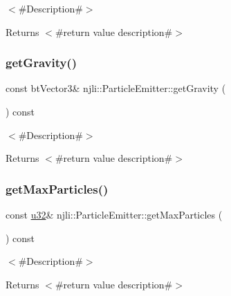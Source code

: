 $<$\#\+Description\#$>$

\begin{DoxyReturn}{Returns}
$<$\#return value description\#$>$ 
\end{DoxyReturn}
\mbox{\label{classnjli_1_1_particle_emitter_a35f6b8d1fd24e55ad727a647a711b6d4}} 
\subsubsection{\texorpdfstring{get\+Gravity()}{getGravity()}}
{\footnotesize\ttfamily const bt\+Vector3\& njli\+::\+Particle\+Emitter\+::get\+Gravity (\begin{DoxyParamCaption}{ }\end{DoxyParamCaption}) const}

$<$\#\+Description\#$>$

\begin{DoxyReturn}{Returns}
$<$\#return value description\#$>$ 
\end{DoxyReturn}
\mbox{\label{classnjli_1_1_particle_emitter_a655c16bec98188b693b70390ed62fc07}} 
\subsubsection{\texorpdfstring{get\+Max\+Particles()}{getMaxParticles()}}
{\footnotesize\ttfamily const \mbox{\hyperlink{_util_8h_a10e94b422ef0c20dcdec20d31a1f5049}{u32}}\& njli\+::\+Particle\+Emitter\+::get\+Max\+Particles (\begin{DoxyParamCaption}{ }\end{DoxyParamCaption}) const}

$<$\#\+Description\#$>$

\begin{DoxyReturn}{Returns}
$<$\#return value description\#$>$ 
\end{DoxyReturn}
\mbox{\label{classnjli_1_1_particle_emitter_ace47cbeba0be70a1840a4732a3a06967}} 
